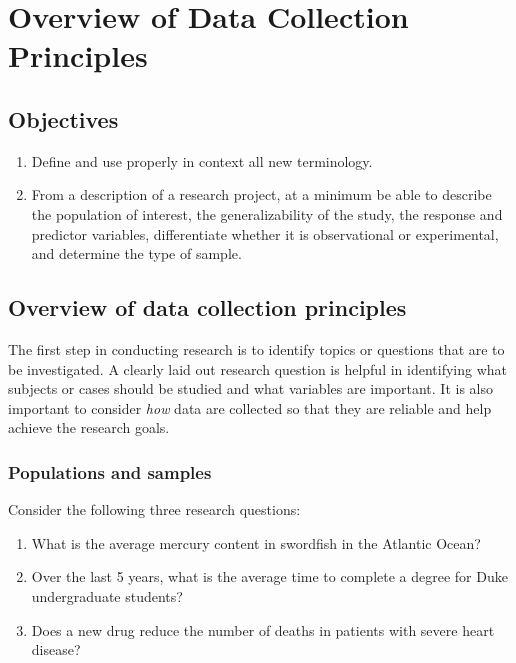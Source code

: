 \documentclass[
]{book}
\providecommand{\tightlist}{%
  \setlength{\itemsep}{0pt}\setlength{\parskip}{0pt}}
\begin{document}
\hypertarget{ODCP}{%
\chapter{Overview of Data Collection Principles}\label{ODCP}}

\hypertarget{objectives-2}{%
\section{Objectives}\label{objectives-2}}

\begin{enumerate}
\def\labelenumi{\arabic{enumi})}
\tightlist
\item
  Define and use properly in context all new terminology.\\
\item
  From a description of a research project, at a minimum be able to describe the population of interest, the generalizability of the study, the response and predictor variables, differentiate whether it is observational or experimental, and determine the type of sample.
\end{enumerate}

\hypertarget{overview-of-data-collection-principles}{%
\section{Overview of data collection principles}\label{overview-of-data-collection-principles}}

The first step in conducting research is to identify topics or questions that are to be investigated. A clearly laid out research question is helpful in identifying what subjects or cases should be studied and what variables are important. It is also important to consider \emph{how} data are collected so that they are reliable and help achieve the research goals.

\hypertarget{populations-and-samples}{%
\subsection{Populations and samples}\label{populations-and-samples}}

Consider the following three research questions:

\begin{enumerate}
\def\labelenumi{\arabic{enumi}.}
\tightlist
\item
  What is the average mercury content in swordfish in the Atlantic Ocean?\\
\item
  Over the last 5 years, what is the average time to complete a degree for Duke undergraduate students?\\
\item
  Does a new drug reduce the number of deaths in patients with severe heart disease?
\end{enumerate}
\end{document}

